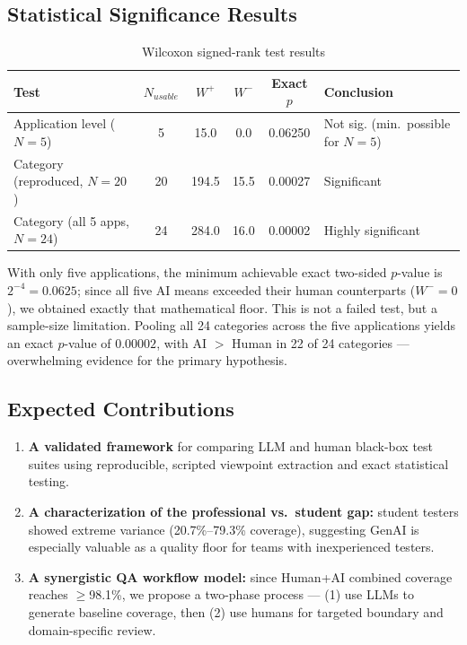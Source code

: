 \documentclass[12pt,a4paper]{article}
\begin{document}
\subsection*{Statistical Significance Results}
\begin{table}[H]
\centering
\caption{Wilcoxon signed-rank test results}
\label{tab:wilcoxon}
\small
\begin{tabular}{lccccl}
\toprule
\textbf{Test} & \textbf{$N_{usable}$} & \textbf{$W^+$} & \textbf{$W^-$} & \textbf{Exact $p$} & \textbf{Conclusion} \\
\midrule
Application level ($N=5$) & 5 & 15.0 & 0.0 & 0.06250 & Not sig. (min.\ possible for $N{=}5$) \\
Category (reproduced, $N=20$) & 20 & 194.5 & 15.5 & 0.00027 & Significant \\
Category (all 5 apps, $N=24$) & 24 & 284.0 & 16.0 & 0.00002 & Highly significant \\
\bottomrule
\end{tabular}
\end{table}

With only five applications, the minimum achievable exact two-sided $p$-value is $2^{-4}=0.0625$; since all five AI means exceeded their human counterparts ($W^-=0$), we obtained exactly that mathematical floor. This is not a failed test, but a sample-size limitation. Pooling all 24 categories across the five applications yields an exact $p$-value of $0.00002$, with AI $>$ Human in 22 of 24 categories --- overwhelming evidence for the primary hypothesis.

\subsection*{Expected Contributions}
\begin{enumerate}[leftmargin=1.2cm]
    \item \textbf{A validated framework} for comparing LLM and human black-box test suites using reproducible, scripted viewpoint extraction and exact statistical testing.
    \item \textbf{A characterization of the professional vs.\ student gap:} student testers showed extreme variance (20.7\%--79.3\% coverage), suggesting GenAI is especially valuable as a quality floor for teams with inexperienced testers.
    \item \textbf{A synergistic QA workflow model:} since Human+AI combined coverage reaches $\geq$98.1\%, we propose a two-phase process --- (1) use LLMs to generate baseline coverage, then (2) use humans for targeted boundary and domain-specific review.
\end{enumerate}
\end{document}
